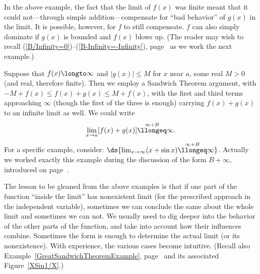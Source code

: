 In the above example, the fact that the limit of $f(x)$ was
finite meant that it could not---through simple addition---compensate
for ``bad behavior'' of $g(x)$ in the limit.  It is possible,
however, for $f$ to still compensate. $f$ can also simply dominate
if $g(x)$ is bounded and $f(x)$ blows up.  (The reader may wish
to recall
(\ref{B/Infinity=0})--(\ref{B-Infinity=-Infinity}), 
page~\pageref{B/Infinity=0} as we work the
next example.)

\bex
Suppose that $f(x)\longto\infty$ and $|g(x)|\le M$ for
$x$ near $a$, some real $M>0$ (and real, therefore finite).  
Then we employ a Sandwich Theorem
argument, with  $-M+f(x)\le f(x)+g(x)\le M+f(x)$, with 
the first and third terms approaching $\infty$ (though
the first of the three is enough) carrying $f(x)+g(x)$
to an infinite limit as well.  We could write
$$\lim_{x\to a}[f(x)+g(x)]\overset{\infty+B}{\llongeq}\infty.$$
For a specific example, consider:
$\ds{\lim_{x\to\infty}(x+\sin x)\overset{\infty+B}{\llongeq}\infty}$.
\eex
Actually we worked exactly this example during the discussion
of the form $B+\infty$, introduced on page~\pageref{B+Infinity=Infinity}.

The lesson to be gleaned from the above examples is that 
if one part of the function ``inside the limit'' has nonexistent
limit (for the prescribed approach in the independent variable),
sometimes we can conclude the same about the
whole limit and sometimes we can not.  We usually need to dig 
deeper into the behavior of the other parts of the function, and
take into account how their influences combine.  Sometimes the form
is enough to determine the actual limit (or its nonexistence).
With experience, the various cases become 
intuitive. (Recall also Example~\ref{GreatSandwichTheoremExample},
page~\pageref{GreatSandwichTheoremExample}
and its associated Figure~\ref{XSin1/X}.)

